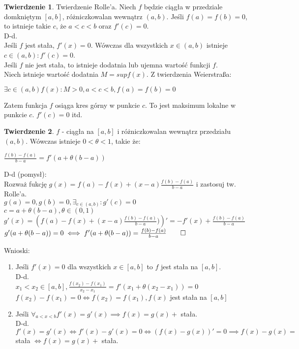 \documentclass{article}
\theoremstyle{definition}
\theoremstyle{definition}
\newtheorem{tw}{Twierdzenie}[subsection]
\theoremstyle{definition}
\theoremstyle{definition}
\begin{document}
\begin{tw}
    Twierdzenie Rolle'a. Niech $f$ będzie ciągła w przedziale domkniętym $[a,b]$, różniczkowalan wewnątrz $(a,b)$. Jeśli $f(a)=f(b)=0$, to istnieje takie $c$, że $a<c<b$ oraz $f'(c)=0$.\\
    D-d.\\
    Jeśli $f$ jest stała, $f'(x)=0$. Wówczas dla wszystkich $x\in(a,b)$ istnieje $c\in(a,b) : f'(c)=0$.\\
    Jeśli $f$ nie jest stała, to istnieje dodatnia lub ujemna wartość funkcji $f$.\\
    Niech istnieje wartość dodatnia $M=sup f(x)$. Z twierdzenia Weierstraßa:
    \begin{center}
        $\exists c\in(a,b) f(x) : M>0, a<c<b, f(a)=f(b)=0$
    \end{center}
    Zatem funkcja $f$ osiąga kres górny w punkcie $c$. To jest maksimum lokalne w punkcie $c$. $f'(c)=0$ itd.
\end{tw}

\begin{tw}
    $f$ - ciągła na $[a,b]$ i różniczkowalan wewnątrz przedziału $(a,b)$. Wówczas istnieje $0<\theta<1$, takie że:
    \begin{center}
        $\frac{f(b)-f(a)}{b-a} = f'(a+\theta(b-a))$
    \end{center}
    D-d (pomysł):\\
    Rozważ fukcję $g(x)=f(a)-f(x)+(x-a)\frac{f(b)-f(a)}{b-a}$ i zastosuj tw. Rolle'a.\\
    $g(a)=0, g(b)=0, \exists_{c\in(a,b)} : g'(c)=0$\\
    $c=a+\theta(b-a), \theta\in(0,1)$\\
    $g'(x)=\left(f(a)-f(x)+(x-a)\frac{f(b)-f(a)}{b-a})\right)'=-f'(x)+\frac{f(b)-f(a)}{b-a}$\\
    $g'(a+\theta(b-a))=0 \iff f'(a+\theta(b-a)) = \frac{f(b)-f(a)}{b-a}\qed$
\end{tw}
Wnioski:
\begin{enumerate}
    \item Jeśli $f'(x)=0$ dla wszystkich $x\in[a,b]$ to $f$ jest stała na $[a,b]$.\\
    D-d.\\
    $x_1<x_2\in[a,b], \frac{f(x_2)-f(x_1)}{x_2-x_1} = f'(x_1+\theta(x_2-x_1))=0$\\
    $f(x_2)-f(x_1) = 0 \iff f(x_2) = f(x_1), f(x)$ jest stała na $[a,b]$
    \item Jeśli $\forall_{a<x<b} f'(x)=g'(x) \implies f(x)=g(x) + $ stała.\\
    D-d.\\
    $f'(x)=g'(x)\iff f'(x)-g'(x)=0 \iff (f(x)-g(x))'=0 \implies f(x)-g(x) =$ stała $\iff f(x)=g(x) + $ stała.
\end{enumerate}
\end{document}
